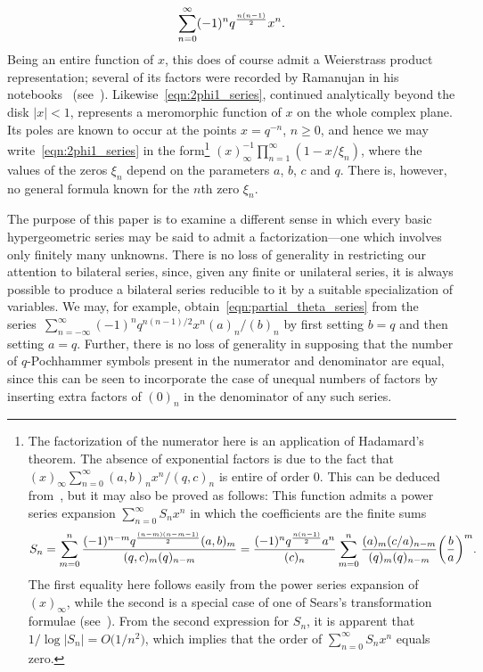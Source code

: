 \documentclass[pdftex]{sigma}
\numberwithin{equation}{section}
\begin{document}
\begin{equation} \label{eqn:partial_theta_series}
\sum_{n=0}^\infty (-1)^n q^{n(n-1) \over 2} x^n.
\end{equation}
Being an entire function of $x$, this does of course admit a Weierstrass product representation; several of its factors were recorded by Ramanujan in his notebooks~\cite[p.~26]{Ramanujan1988} (see~\cite[pp.~285--286]{Andrews2005}). Likewise~\eqref{eqn:2phi1_series}, continued analytically beyond the disk $|x|<1$, represents a meromorphic function of $x$ on the whole complex plane. Its poles are known to occur at the points $x=q^{-n}$, $n \geq 0$, and hence we may write~\eqref{eqn:2phi1_series} in the form\footnote{The factorization of the numerator here is an application of Hadamard's theorem. The absence of exponential factors is due to the fact that $(x)_\infty \sum_{n=0}^\infty (a,b)_n x^n/(q,c)_n$ is entire of order $0$. This can be deduced from~\cite[equation~(4.3.2)]{Gasper2004}, but it may also be proved as follows: This function admits a power series expansion $\sum_{n=0}^\infty S_n x^n$ in which the coefficients are the finite sums
\[ S_n = \sum_{m=0}^n {(-1)^{n-m} q^{(n-m)(n-m-1) \over 2} (a,b)_m \over (q,c)_m (q)_{n-m}} = {(-1)^n q^{n(n-1) \over 2} a^n \over (c)_n} \sum_{m=0}^n {(a)_m (c/a)_{n-m} \over (q)_m (q)_{n-m}} \bigg( {b \over a} \bigg)^{ m}. \]
The first equality here follows easily from the power series expansion of $(x)_\infty$, while the second is a special case of one of Sears's transformation formulae (see~\cite[equation~(3.2.2)]{Gasper2004}). From the second expression for $S_n$, it is apparent that $1/\log|S_n| = O\bigl(1/n^2\bigr)$, which implies that the order of $\sum_{n=0}^\infty S_n x^n$ equals zero.} $(x)_\infty^{-1}\prod_{n=1}^\infty (1-x/\xi_n)$, where the values of the zeros $\xi_n$ depend on the parameters $a$, $b$, $c$ and $q$. There is, however, no general formula known for the $n$th zero $\xi_n$.

The purpose of this paper is to examine a different sense in which every basic hypergeometric series may be said to admit a factorization---one which involves only finitely many unknowns. There is no loss of generality in restricting our attention to bilateral series, since, given any finite or unilateral series, it is always possible to produce a bilateral series reducible to it by a suitable specialization of variables. We may, for example, obtain~\eqref{eqn:partial_theta_series} from the series~${\sum_{n=-\infty}^\infty (-1)^n q^{n(n-1)/2} x^n (a)_n/(b)_n}$ by first setting $b=q$ and then setting $a=q$. Further, there is no loss of generality in supposing that the number of $q$-Pochhammer symbols present in the numerator and denominator are equal, since this can be seen to incorporate the case of unequal numbers of factors by inserting extra factors of $(0)_n$ in the denominator of any such series.
\end{document}
